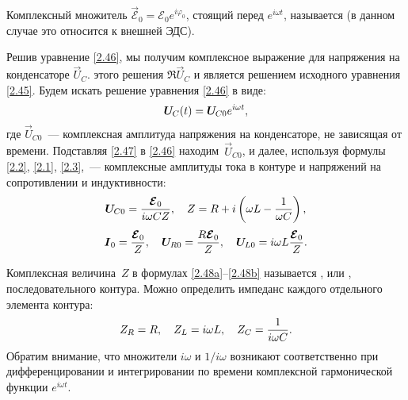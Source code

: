 Комплексный множитель $\vec{\mathcal{E}}_0=\mathcal{E}_0e^{i\varphi_0}$, стоящий
перед $e^{i\omega t}$, называется  (в данном
случае это относится к внешней ЭДС). 

Решив уравнение \eqref{2.46}, мы получим
комплексное выражение для напряжения на конденсаторе $\vec{U}_{\! C}$. 
 этого решения
$\Re \vec{U}_{\! C}$ и является решением исходного уравнения \eqref{2.45}.
Будем искать решение уравнения \eqref{2.46} в виде:
\begin{equation}\eqmark{2.47}
\vec{U}_{\! C}(t)=\vec{U}_{\! C0}e^{i\omega t},
\end{equation}
где $\vec{U}_{\! C0}$~--- комплексная амплитуда напряжения на конденсаторе, не
зависящая от времени. Подставляя \eqref{2.47} в \eqref{2.46} 
находим~$\vec{U}_{\! C0}$, и далее, используя формулы \eqref{2.2}, \eqref{2.1},
\eqref{2.3},~--- комплексные амплитуды тока в контуре и напряжений на
сопротивлении и индуктивности:
		\begin{equation}
			\eqmark{2.48a}
	\vec{U}_{\! C0}=\frac{\vec{\mathcal{E}}_0}{i\omega CZ}, 
    \quad Z=R+i\left(\omega L-\frac{1}{\omega C}\right),
		\end{equation}
		\begin{equation}
			\eqmark{2.48b}
			\vec I_0=\frac{\vec{\mathcal{E}}_0}{Z}, \quad
			\vec{U}_{\! R0}=\frac{R\vec{\mathcal{E}}_0}{Z}, \quad
			\vec{U}_{\! L0}=i\omega L\frac{\vec{\mathcal{E}}_0}{Z}.
		\end{equation}

Комплексная величина~$Z$ в формулах \eqref{2.48a}--\eqref{2.48b} называется
, или ,
последовательного контура.
Можно определить импеданс каждого отдельного элемента контура:
\begin{equation}
	\eqmark{2.49}
			Z_R=R, \quad Z_L=i\omega L, \quad Z_C=\frac{1}{i\omega C}.
\end{equation}
Обратим внимание, что множители $i\omega$ и $1/i\omega$
возникают соответственно при дифференцировании и интегрировании по времени 
комплексной гармонической функции $e^{i\omega t}$.


